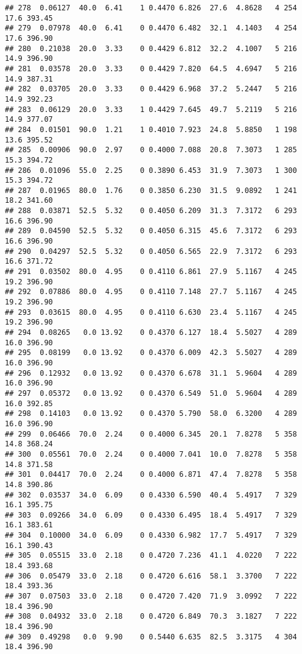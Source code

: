 \documentclass[
]{article}
\begin{document}
\begin{verbatim}
## 278  0.06127  40.0  6.41    1 0.4470 6.826  27.6  4.8628   4 254    17.6 393.45
## 279  0.07978  40.0  6.41    0 0.4470 6.482  32.1  4.1403   4 254    17.6 396.90
## 280  0.21038  20.0  3.33    0 0.4429 6.812  32.2  4.1007   5 216    14.9 396.90
## 281  0.03578  20.0  3.33    0 0.4429 7.820  64.5  4.6947   5 216    14.9 387.31
## 282  0.03705  20.0  3.33    0 0.4429 6.968  37.2  5.2447   5 216    14.9 392.23
## 283  0.06129  20.0  3.33    1 0.4429 7.645  49.7  5.2119   5 216    14.9 377.07
## 284  0.01501  90.0  1.21    1 0.4010 7.923  24.8  5.8850   1 198    13.6 395.52
## 285  0.00906  90.0  2.97    0 0.4000 7.088  20.8  7.3073   1 285    15.3 394.72
## 286  0.01096  55.0  2.25    0 0.3890 6.453  31.9  7.3073   1 300    15.3 394.72
## 287  0.01965  80.0  1.76    0 0.3850 6.230  31.5  9.0892   1 241    18.2 341.60
## 288  0.03871  52.5  5.32    0 0.4050 6.209  31.3  7.3172   6 293    16.6 396.90
## 289  0.04590  52.5  5.32    0 0.4050 6.315  45.6  7.3172   6 293    16.6 396.90
## 290  0.04297  52.5  5.32    0 0.4050 6.565  22.9  7.3172   6 293    16.6 371.72
## 291  0.03502  80.0  4.95    0 0.4110 6.861  27.9  5.1167   4 245    19.2 396.90
## 292  0.07886  80.0  4.95    0 0.4110 7.148  27.7  5.1167   4 245    19.2 396.90
## 293  0.03615  80.0  4.95    0 0.4110 6.630  23.4  5.1167   4 245    19.2 396.90
## 294  0.08265   0.0 13.92    0 0.4370 6.127  18.4  5.5027   4 289    16.0 396.90
## 295  0.08199   0.0 13.92    0 0.4370 6.009  42.3  5.5027   4 289    16.0 396.90
## 296  0.12932   0.0 13.92    0 0.4370 6.678  31.1  5.9604   4 289    16.0 396.90
## 297  0.05372   0.0 13.92    0 0.4370 6.549  51.0  5.9604   4 289    16.0 392.85
## 298  0.14103   0.0 13.92    0 0.4370 5.790  58.0  6.3200   4 289    16.0 396.90
## 299  0.06466  70.0  2.24    0 0.4000 6.345  20.1  7.8278   5 358    14.8 368.24
## 300  0.05561  70.0  2.24    0 0.4000 7.041  10.0  7.8278   5 358    14.8 371.58
## 301  0.04417  70.0  2.24    0 0.4000 6.871  47.4  7.8278   5 358    14.8 390.86
## 302  0.03537  34.0  6.09    0 0.4330 6.590  40.4  5.4917   7 329    16.1 395.75
## 303  0.09266  34.0  6.09    0 0.4330 6.495  18.4  5.4917   7 329    16.1 383.61
## 304  0.10000  34.0  6.09    0 0.4330 6.982  17.7  5.4917   7 329    16.1 390.43
## 305  0.05515  33.0  2.18    0 0.4720 7.236  41.1  4.0220   7 222    18.4 393.68
## 306  0.05479  33.0  2.18    0 0.4720 6.616  58.1  3.3700   7 222    18.4 393.36
## 307  0.07503  33.0  2.18    0 0.4720 7.420  71.9  3.0992   7 222    18.4 396.90
## 308  0.04932  33.0  2.18    0 0.4720 6.849  70.3  3.1827   7 222    18.4 396.90
## 309  0.49298   0.0  9.90    0 0.5440 6.635  82.5  3.3175   4 304    18.4 396.90

\end{verbatim}
\end{document}
